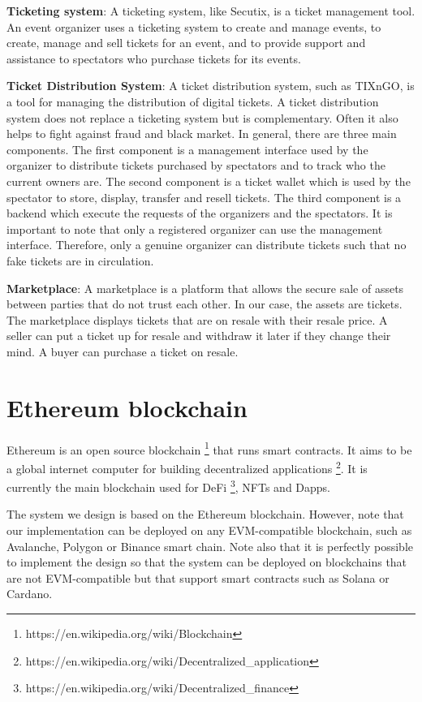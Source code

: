 \documentclass[a4paper,11pt,oneside]{report}
\begin{document}
\begin{description}
    \item \textbf{Ticketing system}: A ticketing system, like Secutix, is a ticket management tool. An event organizer uses a ticketing system to create and manage events, to create, manage and sell tickets for an event, and to provide support and assistance to spectators who purchase tickets for its events.
    \item \textbf{Ticket Distribution System}: A ticket distribution system, such as TIXnGO, is a tool for managing the distribution of digital tickets. A ticket distribution system does not replace a ticketing system but is complementary. Often it also helps to fight against fraud and black market. In general, there are three main components. The first component is a management interface used by the organizer to distribute tickets purchased by spectators and to track who the current owners are. The second component is a ticket wallet which is used by the spectator to store, display, transfer and resell tickets. The third component is a backend which execute the requests of the organizers and the spectators. It is important to note that only a registered organizer can use the management interface. Therefore, only a genuine organizer can distribute tickets such that no fake tickets are in circulation.
    \item \textbf{Marketplace}: A marketplace is a platform that allows the secure sale of assets between parties that do not trust each other. In our case, the assets are tickets. The marketplace displays tickets that are on resale with their resale price. A seller can put a ticket up for resale and withdraw it later if they change their mind. A buyer can purchase a ticket on resale.
\end{description}

\section{Ethereum blockchain}
Ethereum is an open source blockchain \footnote{https://en.wikipedia.org/wiki/Blockchain} that runs smart contracts. It aims to be a global internet computer for building decentralized applications \footnote{https://en.wikipedia.org/wiki/Decentralized\_application}. It is currently the main blockchain used for DeFi \footnote{https://en.wikipedia.org/wiki/Decentralized\_finance}, NFTs and Dapps.

The system we design is based on the Ethereum blockchain. However, note that our implementation can be deployed on any EVM-compatible blockchain, such as Avalanche, Polygon or Binance smart chain. Note also that it is perfectly possible to implement the design so that the system can be deployed on blockchains that are not EVM-compatible but that support smart contracts such as Solana or Cardano.
\end{document}
